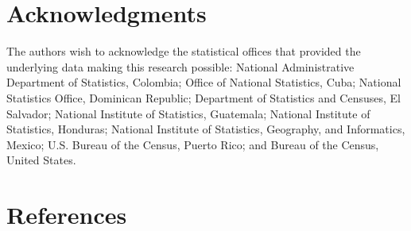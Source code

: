 \documentclass[
]{article}
\begin{document}
\newpage
\section*{Acknowledgments}

The authors wish to acknowledge the statistical offices that provided
the underlying data making this research possible: National
Administrative Department of Statistics, Colombia; Office of National
Statistics, Cuba; National Statistics Office, Dominican Republic;
Department of Statistics and Censuses, El Salvador; National Institute
of Statistics, Guatemala; National Institute of Statistics, Honduras;
National Institute of Statistics, Geography, and Informatics, Mexico;
U.S. Bureau of the Census, Puerto Rico; and Bureau of the Census, United
States.

\newpage

\newpage

\section*{References}\label{references}
\end{document}

